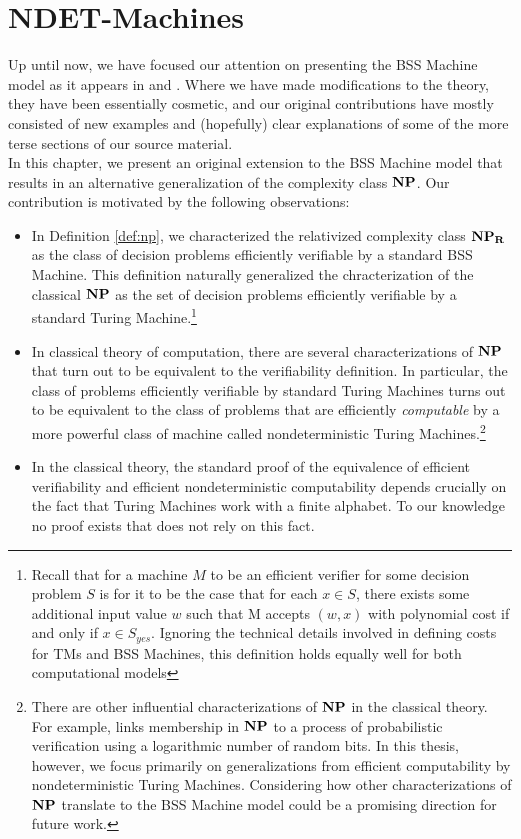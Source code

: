 \chapter{NDET-Machines}
\label{chap:ndet}

Up until now, we have focused our attention on presenting the BSS
Machine model as it appears in \cite{B89} and \cite{B98}.  Where we
have made modifications to the theory, they have been essentially
cosmetic, and our original contributions have mostly consisted of new
examples and (hopefully) clear explanations of some of the more terse
sections of our source material.\\

In this chapter, we present an original extension to the BSS Machine
model that results in an alternative generalization of the complexity
class $\mathbf{NP}$.  Our contribution is motivated by the following
observations:

\begin{itemize}

\item In Definition \ref{def:np}, we characterized the relativized
  complexity class $\mathbf{NP_R}$ as the class of decision problems efficiently
  verifiable by a standard BSS Machine.  This definition naturally
  generalized the chracterization of the classical $\mathbf{NP}$ as the set
  of decision problems efficiently verifiable by a standard Turing
  Machine.\footnote{Recall that for a machine $M$ to be an efficient
    verifier for some decision problem $S$ is for it to be the case
    that for each $x \in S$, there exists some additional input value
    $w$ such that M accepts $(w, x)$ with polynomial cost if and only
    if $x \in S_{yes}$.  Ignoring the technical details involved in
    defining costs for TMs and BSS Machines, this definition holds
    equally well for both computational models}
  
\item In classical theory of computation, there are several
  characterizations of $\mathbf{NP}$ that turn out to be equivalent to the
  verifiability definition.  In particular, the class of problems
  efficiently verifiable by standard Turing Machines turns out to be
  equivalent to the class of problems that are efficiently
  \emph{computable} by a more powerful class of machine called
  nondeterministic Turing Machines.\footnote{There are other
    influential characterizations of $\mathbf{NP}$ in the classical theory.
    For example, \cite{AS98} links membership in $\mathbf{NP}$ to a process
    of probabilistic verification using a logarithmic number of random
    bits.  In this thesis, however, we focus primarily on
    generalizations from efficient computability by nondeterministic
    Turing Machines.  Considering how other characterizations of
    $\mathbf{NP}$ translate to the BSS Machine model could be a promising
    direction for future work.}

\item In the classical theory, the standard proof of the equivalence
  of efficient verifiability and efficient nondeterministic
  computability depends crucially on the fact that Turing Machines
  work with a finite alphabet.  To our knowledge no proof exists that
  does not rely on this fact.
\end{itemize}

